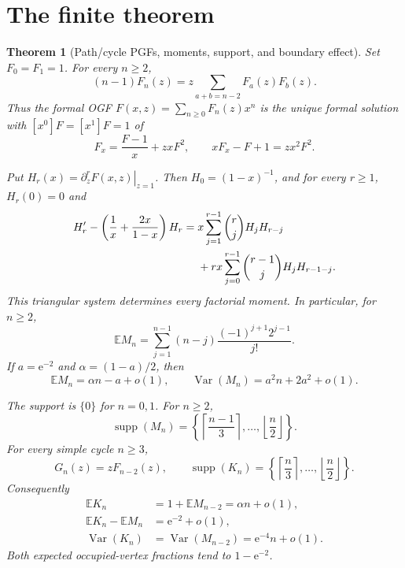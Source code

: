\documentclass[10pt]{article}
\newtheorem{theorem}{Theorem}
\newcommand{\E}{\mathbb E}
\newcommand{\Var}{\operatorname{Var}}
\newcommand{\supp}{\operatorname{supp}}
\newcommand{\e}{\mathrm e}
\begin{document}
\section{The finite theorem}

\begin{theorem}[Path/cycle PGFs, moments, support, and boundary effect]
\label{thm:main}
Set $F_0=F_1=1$.  For every $n\ge2$,
\begin{equation}\label{eq:convolution}
 (n-1)F_n(z)=z\sum_{a+b=n-2}F_a(z)F_b(z).
\end{equation}
Thus the formal OGF $F(x,z)=\sum_{n\ge0}F_n(z)x^n$ is the unique formal
solution with $[x^0]F=[x^1]F=1$ of
\begin{equation}\label{eq:riccati}
 F_x=\frac{F-1}{x}+zxF^2,
 \qquad xF_x-F+1=zx^2F^2.
\end{equation}

Put $H_r(x)=\left.\partial_z^rF(x,z)\right|_{z=1}$.  Then
$H_0=(1-x)^{-1}$, and for every $r\ge1$, $H_r(0)=0$ and
\begin{align}
 H_r'-\left(\frac1x+\frac{2x}{1-x}\right)H_r
  ={}&x\sum_{j=1}^{r-1}\binom{r}{j}H_jH_{r-j} \notag\\
   &+rx\sum_{j=0}^{r-1}\binom{r-1}{j}H_jH_{r-1-j}.
\label{eq:triangle}
\end{align}
This triangular system determines every factorial moment.  In particular,
for $n\ge2$,
\begin{equation}\label{eq:meanexact}
 \E M_n=\sum_{j=1}^{n-1}
 (n-j)\frac{(-1)^{j+1}2^{j-1}}{j!}.
\end{equation}
If $a=\e^{-2}$ and $\alpha=(1-a)/2$, then
\begin{equation}\label{eq:pathasym}
 \E M_n=\alpha n-a+o(1),\qquad
 \Var(M_n)=a^2n+2a^2+o(1).
\end{equation}

The support is $\{0\}$ for $n=0,1$.  For $n\ge2$,
\begin{equation}\label{eq:pathsupport}
 \supp(M_n)=
 \left\{\left\lceil\frac{n-1}{3}\right\rceil,
 \ldots,\left\lfloor\frac n2\right\rfloor\right\}.
\end{equation}
For every simple cycle $n\ge3$,
\begin{equation}\label{eq:cycleidentity}
 G_n(z)=zF_{n-2}(z),
 \qquad
 \supp(K_n)=
 \left\{\left\lceil\frac n3\right\rceil,
 \ldots,\left\lfloor\frac n2\right\rfloor\right\}.
\end{equation}
Consequently
\begin{align}
 \E K_n&=1+\E M_{n-2}=\alpha n+o(1),\label{eq:cyclemean}\\
 \E K_n-\E M_n&=\e^{-2}+o(1),\label{eq:boundarymean}\\
 \Var(K_n)&=\Var(M_{n-2})=\e^{-4}n+o(1).
 \label{eq:cyclevariance}
\end{align}
Both expected occupied-vertex fractions tend to $1-\e^{-2}$.
\end{theorem}
\end{document}
